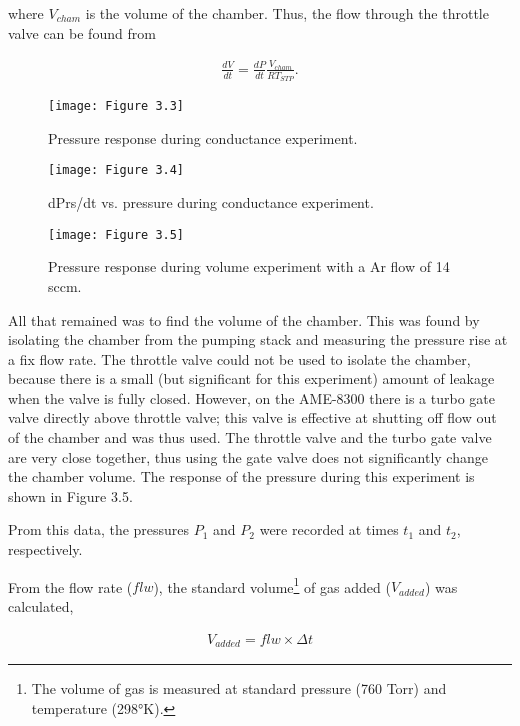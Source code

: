 \noindent where $V_{cham}$ is the volume of the chamber. Thus, the flow through the throttle valve can be found from


\begin{align}
	\frac{dV}{dt} = \frac{dP}{dt}\frac{V_{cham}}{RT_{STP}}.
\end{align}


\begin{figure}[H]
	\centering
	\texttt{[image: Figure 3.3]}
	\bf\caption{ Pressure response during conductance experiment.}
	\label{fig:3.3}
\end{figure}

\begin{figure}[H]
	\centering
	\texttt{[image: Figure 3.4]}
	\bf\caption{ dPrs/dt vs. pressure during conductance experiment.}
	\label{fig:3.4}
\end{figure}

\begin{figure}[H]
	\centering
	\texttt{[image: Figure 3.5]}
	\bf\caption{ Pressure response during volume experiment with a Ar flow of 14 sccm.}
	\label{fig:3.5}
\end{figure}

All that remained was to find the volume of the chamber. This was found by isolating the chamber from the pumping stack and measuring the pressure rise at a fix flow rate. The throttle valve could not be used to isolate the chamber, because there is a small (but significant for this experiment) amount of leakage when the valve is fully closed. However, on the AME-8300 there is a turbo gate valve directly above throttle valve; this valve is effective at shutting off flow out of the chamber and was thus used. The throttle valve and the turbo gate valve are very close together, thus using the gate valve does not significantly change the chamber volume. The response of the pressure during this experiment is shown in Figure 3.5.


Prom this data, the pressures $P_{1}$ and $P_{2}$ were recorded at times $t_{1}$ and $t_{2}$, respectively.

From the flow rate ($flw$), the standard volume\footnote{The volume of gas is measured at standard pressure (760 Torr) and temperature (298°K).} of gas added ($V_{added}$) was calculated,

\begin{align}
	V_{added} = flw \times \Delta t
\end{align}

